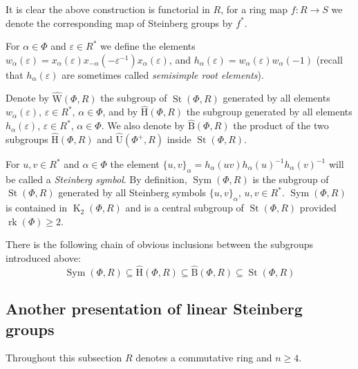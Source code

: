 \documentclass[oneside, 10pt]{amsart}
\DeclareMathOperator{\St}{St}
\DeclareMathOperator{\K}{K}
\DeclareMathOperator{\rk}{rk}
\DeclareMathOperator{\Sym}{Sym}
\newcommand{\UU}{\hat{\mathrm{U}}}      %
\newcommand{\StB}{\hat{\mathrm{B}}}     %
\newcommand{\StH}{\hat{\mathrm{H}}}     %
\newcommand{\StW}{\hat{\mathrm{W}}}     %
\numberwithin{equation}{section}
\newtheorem{lemma}{Lemma}
\numberwithin{lemma}{section}
\theoremstyle{definition}
\theoremstyle{remark}
\begin{document}
It is clear the above construction is functorial in $R$, for a ring map $f\colon R\to S$ we denote the corresponding map of Steinberg groups by $f^*$.

For $\alpha\in\Phi$ and $\varepsilon \in R^*$ we define the elements $w_\alpha(\varepsilon) = x_\alpha(\varepsilon) x_{-\alpha}(-\varepsilon^{-1}) x_\alpha(\varepsilon)$,
 and $h_\alpha(\varepsilon)=w_\alpha(\varepsilon)w_\alpha(-1)$ (recall that $h_\alpha(\varepsilon)$ are sometimes called {\it semisimple root elements}).
\begin{comment} 
 Let us recall the standard identities which hold for these elements.
\begin{lemma} \label{lem:Mat5.2}
 The following identities are true.
 \begin{lemlist}
  \item Lol
  \item Lol2
 \end{lemlist}
\end{lemma}
\end{comment}
 
Denote by $\StW(\Phi, R)$ the subgroup of $\St(\Phi, R)$ generated by all elements
$w_\alpha(\varepsilon)$, $\varepsilon\in R^*$, $\alpha\in\Phi$, and by $\StH(\Phi,R)$
 the subgroup generated by all elements $h_\alpha(\varepsilon)$, $\varepsilon\in R^*$, $\alpha\in\Phi$.
We also denote by $\StB(\Phi, R)$ the product of the two subgroups $\StH(\Phi, R)$ and $\UU(\Phi^+, R)$ inside $\St(\Phi, R)$.
 
For $u, v \in R^*$ and $\alpha\in\Phi$ the element $\{u,v\}_\alpha=h_\alpha(uv)h_\alpha(u)^{-1}h_\alpha(v)^{-1}$ will be
 called a {\it Steinberg symbol}. By definition, $\Sym(\Phi, R)$ is the subgroup of $\St(\Phi, R)$ generated by all Steinberg symbols $\{u, v\}_\alpha$, $u, v \in R^*$. 
$\Sym(\Phi, R)$ is contained in $\K_2(\Phi, R)$ and is a central subgroup of $\St(\Phi, R)$ provided $\rk(\Phi)\geq 2$.

There is the following chain of obvious inclusions between the subgroups introduced above:
\begin{equation}
  \Sym(\Phi, R) \subseteq \StH(\Phi, R) \subseteq \StB(\Phi, R) \subseteq \St(\Phi, R)
\end{equation}

\subsection{Another presentation of linear Steinberg groups} \label{sec:another-presentation}
Throughout this subsection $R$ denotes a commutative ring and $n \geq 4$.
\end{document}
